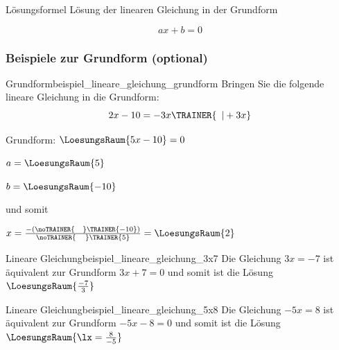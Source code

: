 \begin{gesetz}{Lösungsformel}{}
 Lösung der linearen Gleichung in der Grundform

 $$ax+b=0$$
  
\end{gesetz}

\newpage


\subsubsection{Beispiele zur Grundform (optional)}


\begin{beispiel}{Grundform}{beispiel_lineare_gleichung_grundform}
  Bringen Sie die folgende lineare Gleichung in die Grundform:
  $$2x-10 = -3x\TRAINER{\,\,\,| +3x}$$

  Grundform: $\LoesungsRaum{5x-10} = 0$

  $a = \LoesungsRaum{5}$

  $b = \LoesungsRaum{-10}$

  und somit

  \LARGE{$x=\frac{-(\noTRAINER{\,\,\,\,\,\,}\TRAINER{-10})}{\noTRAINER{\,\,\,\,\,\,\,}\TRAINER{5}}
    = \LoesungsRaum{2}$}

\end{beispiel}


\begin{beispiel}{Lineare Gleichung}{beispiel_lineare_gleichung_3x7}
  Die Gleichung $3x=-7$ ist äquivalent zur Grundform $3x+7=0$ und somit ist die Lösung $\LoesungsRaum{\frac{-7}{3}}$
  \end{beispiel}

\begin{beispiel}{Lineare Gleichung}{beispiel_lineare_gleichung_5x8}
  Die Gleichung $-5x=8$ ist äquivalent zur Grundform $-5x-8=0$ und somit ist die Lösung $\LoesungsRaum{\lx=\frac{8}{-5}}$
\end{beispiel}

\newpage
\TALS{}
\newpage
